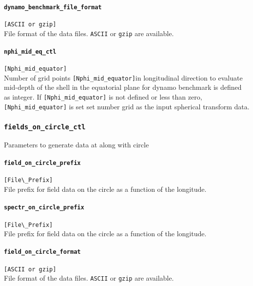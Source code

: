 \paragraph{\tt dynamo\_benchmark\_file\_format}
\label{href_t:dynamo_benchmark_file_format}
\verb|[ASCII or gzip]| \\
File format of the data files. {\tt ASCII} or {\tt gzip} are available.

\paragraph{\tt nphi\_mid\_eq\_ctl}
\label{href_t:nphi_mid_eq_ctl}
\verb|[Nphi_mid_equator]| \\
Number of grid points \verb|[Nphi_mid_equator]|in longitudinal direction to evaluate mid-depth of the shell in the equatorial plane for dynamo benchmark is defined as integer. If \verb|[Nphi_mid_equator]| is not defined or less than zero, \verb|[Nphi_mid_equator]| is set set number grid as the input spherical transform data. 
%

\subsubsection{\tt fields\_on\_circle\_ctl}
\label{href_t:fields_on_circle_ctl}
Parameters to generate data at along with circle

\paragraph{\tt field\_on\_circle\_prefix}
\label{href_t:field_on_circle_prefix}
\verb|[File\_Prefix]| \\
File prefix for field data on the circle as a function of the longitude.

\paragraph{\tt spectr\_on\_circle\_prefix}
\label{href_t:spectr_on_circle_prefix}
\verb|[File\_Prefix]| \\
File prefix for field data on the circle as a function of the longitude.

\paragraph{\tt field\_on\_circle\_format}
\label{href_t:field_on_circle_format}
\verb|[ASCII or gzip]| \\
File format of the data files. {\tt ASCII} or {\tt gzip} are available.

